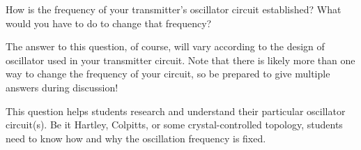 

How is the frequency of your transmitter's oscillator circuit established?  What would you have to do to change that frequency?







The answer to this question, of course, will vary according to the design of oscillator used in your transmitter circuit.  Note that there is likely more than one way to change the frequency of your circuit, so be prepared to give multiple answers during discussion!







This question helps students research and understand their particular oscillator circuit(s).  Be it Hartley, Colpitts, or some crystal-controlled topology, students need to know how and why the oscillation frequency is fixed.



